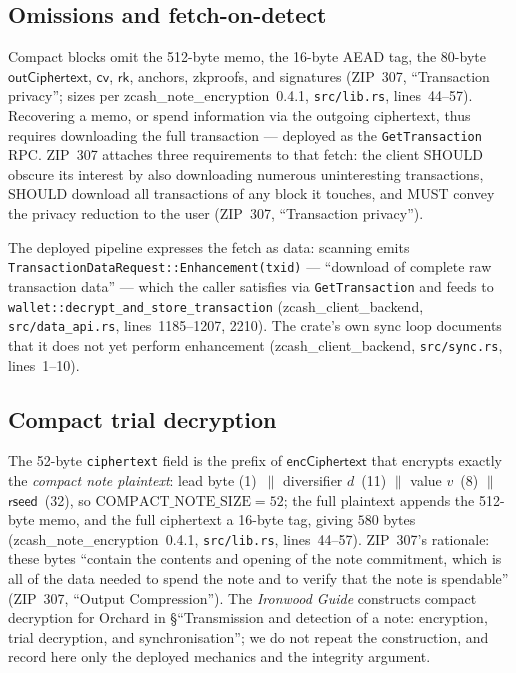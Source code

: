\documentclass[11pt,a4paper]{article}
\theoremstyle{definition}
\newcommand{\cvsym}{\mathsf{cv}}
\newcommand{\rk}{\mathsf{rk}}
\begin{document}
\subsection{Omissions and fetch-on-detect}\label{sec:sync-compact-omitted}

Compact blocks omit the 512-byte memo, the 16-byte AEAD tag, the 80-byte
$\mathsf{outCiphertext}$, $\cvsym$, $\rk$, anchors, zkproofs, and signatures
(ZIP~307, ``Transaction privacy''; sizes per
\textsf{zcash\_note\_encryption}~0.4.1, \texttt{src/lib.rs}, lines~44--57).
Recovering a memo, or spend information via the outgoing ciphertext, thus
requires downloading the full transaction --- deployed as the
\texttt{GetTransaction} RPC. ZIP~307 attaches three requirements to that
fetch: the client SHOULD obscure its interest by also downloading numerous
uninteresting transactions, SHOULD download all transactions of any block it
touches, and MUST convey the privacy reduction to the user (ZIP~307,
``Transaction privacy'').

The deployed pipeline expresses the fetch as data: scanning emits
\texttt{TransactionDataRequest::}\allowbreak\texttt{Enhancement(txid)} ---
``download of complete raw transaction data'' --- which the caller
satisfies via \texttt{GetTransaction} and feeds to
\texttt{wallet::}\allowbreak\texttt{decrypt\_and\_store\_transaction}
(\textsf{zcash\_client\_backend}, \texttt{src/data\_api.rs},
lines~1185--1207, 2210). The crate's own sync loop documents that it does
not yet perform enhancement (\textsf{zcash\_client\_backend},
\texttt{src/sync.rs}, lines~1--10).

\subsection{Compact trial decryption}\label{sec:sync-compact-decrypt}

The 52-byte \texttt{ciphertext} field is the prefix of
$\mathsf{encCiphertext}$ that encrypts exactly the \emph{compact note
plaintext}: lead byte (1)~$\|$ diversifier $d$~(11) $\|$ value $v$~(8) $\|$
$\mathsf{rseed}$~(32), so $\mathrm{COMPACT\_NOTE\_SIZE} = 52$; the full
plaintext appends the 512-byte memo, and the full ciphertext a 16-byte tag,
giving $580$ bytes (\textsf{zcash\_note\_encryption}~0.4.1,
\texttt{src/lib.rs}, lines~44--57). ZIP~307's rationale: these bytes
``contain the contents and opening of the note commitment, which is all of
the data needed to spend the note and to verify that the note is spendable''
(ZIP~307, ``Output Compression''). The \emph{Ironwood Guide} constructs
compact decryption for Orchard in \S``Transmission and detection of a note:
encryption, trial decryption, and synchronisation''; we do not repeat the
construction, and record here only the deployed mechanics and the integrity
argument.
\end{document}
